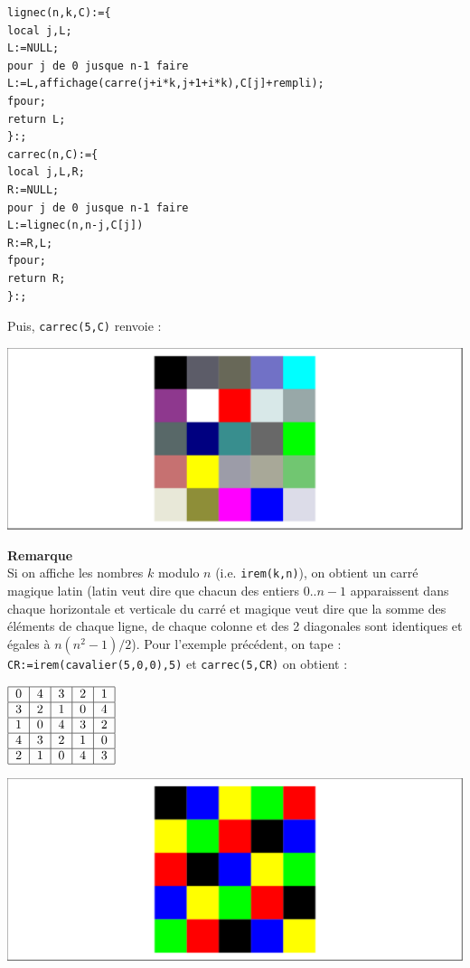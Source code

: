 \documentclass[a4paper,11pt]{book}
\begin{document}
\begin{verbatim}
lignec(n,k,C):={
local j,L;
L:=NULL;
pour j de 0 jusque n-1 faire 
L:=L,affichage(carre(j+i*k,j+1+i*k),C[j]+rempli);
fpour;
return L;
}:;
carrec(n,C):={
local j,L,R;
R:=NULL;
pour j de 0 jusque n-1 faire
L:=lignec(n,n-j,C[j]) 
R:=R,L;
fpour;
return R;
}:;
\end{verbatim}
Puis, {\tt carrec(5,C)} renvoie :
\begin{center}\includegraphics[width=\textwidth]{carreme} \end{center}
{\bf Remarque}\\
Si on affiche les nombres $k$ modulo $n$ (i.e. {\tt irem(k,n)}), on obtient un 
carr\'e magique latin (latin veut dire que chacun des entiers 0..$n-1$ 
apparaissent dans chaque horizontale et  verticale  du carr\'e et magique veut 
dire que la somme des \'el\'ements de chaque ligne, de chaque colonne et des 2 
diagonales sont identiques et \'egales \`a $n(n^2-1)/2$).
Pour l'exemple pr\'ec\'edent, on tape :\\
{\tt CR:=irem(cavalier(5,0,0),5)} et {\tt carrec(5,CR)} on obtient :\\

\begin{minipage}[h]{4cm}
 $
\begin{tabular}{|c|c|c|c|c|}
\hline
0&4&3&2&1\\
\hline
3&2&1&0&4\\
\hline
1&0&4&3&2\\
\hline
4&3&2&1&0\\
\hline
2&1&0&4&3\\
\hline
\end{tabular}
$
\end{minipage}
\begin{minipage}[h]{7cm}
\begin{center}\includegraphics[width=\textwidth]{carreml1}\end{center}
\end{minipage}
\end{document}
